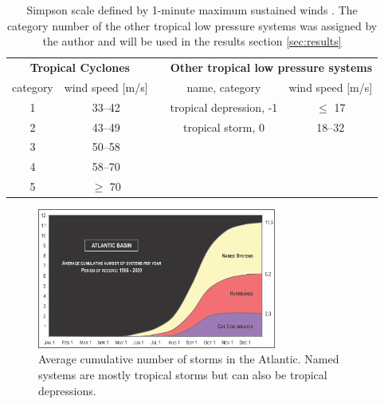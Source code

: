 \begingroup
\setlength{\tabcolsep}{10pt} %
\renewcommand{\arraystretch}{1.5} %
\begin{table}[ht]
	\centering
	\begin{tabular}{|c|c|c|c|c|}
		\cline{1-2} \cline{4-5}
		\multicolumn{2}{|c|}{\textbf{Tropical Cyclones}} &                      & \multicolumn{2}{c|}{\textbf{Other tropical low pressure systems}}                                                  \\ \cline{1-2} \cline{4-5}
		category                                         & wind speed {[}m/s{]} &                                                                   & name, category          & wind speed {[}m/s{]} \\ \cline{1-2} \cline{4-5}
		1                                                & 33--42               &                                                                   & tropical depression, -1 & $\leq$ 17            \\
		2                                                & 43--49               &                                                                   & tropical storm, 0       & 18--32               \\
		3                                                & 50--58               &                                                                   &                         &                      \\
		4                                                & 58--70               &                                                                   &                         &                      \\
		5                                                & $\geq$ 70            &                                                                   &                         &                      \\ \cline{1-2} \cline{4-5}
	\end{tabular}
	\caption{Simpson scale defined by 1-minute maximum sustained winds \cite{simpson}. The category number of the other tropical low pressure systems was assigned by the author and will be used in the results section \ref{sec:results}}
	\label{tab:simpson-scale}
\end{table}
\endgroup

\begin{figure}[ht]
	\centering
	\includegraphics[width=0.7\textwidth]{img/cum-average-cat.png}
	\caption{Average cumulative number of storms in the Atlantic. Named systems are mostly tropical storms but can also be tropical depressions.\cite{climatology}}
	\label{fig:cat-climatology}
\end{figure}

